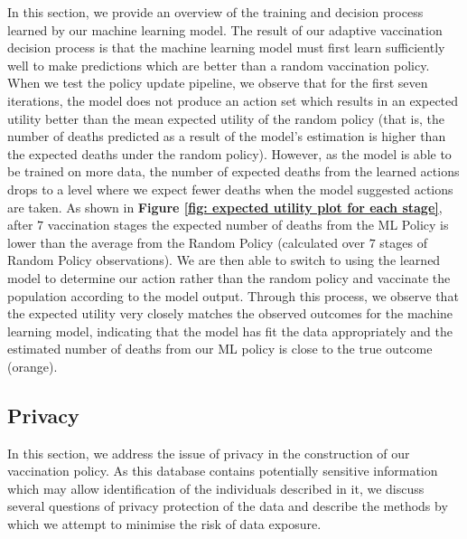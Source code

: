\documentclass{article}
\begin{document}
In this section, we provide an overview of the training and decision process learned by our machine learning model. The result of our adaptive vaccination decision process is that the machine learning model must first learn sufficiently well to make predictions which are better than a random vaccination policy. When we test the policy update pipeline, we observe that for the first seven iterations, the model does not produce an action set which results in an expected utility better than the mean expected utility of the random policy (that is, the number of deaths predicted as a result of the model's estimation is higher than the expected deaths under the random policy). However, as the model is able to be trained on more data, the number of expected deaths from the learned actions drops to a level where we expect fewer deaths when the model suggested actions are taken. As shown in \textbf{Figure \ref{fig: expected utility plot for each stage}}, after $7$ vaccination stages the expected number of deaths from the ML Policy is lower than the average from the Random Policy (calculated over $7$ stages of Random Policy observations). We are then able to switch to using the learned model to determine our action rather than the random policy and vaccinate the population according to the model output. Through this process, we observe that the expected utility very closely matches the observed outcomes for the machine learning model, indicating that the model has fit the data appropriately and the estimated number of deaths from our ML policy is close to the true outcome (orange).

\subsection{Privacy}

In this section, we address the issue of privacy in the construction of our vaccination policy. As this database contains potentially sensitive information which may allow identification of the individuals described in it, we discuss several questions of privacy protection of the data and describe the methods by which we attempt to minimise the risk of data exposure.
\end{document}
